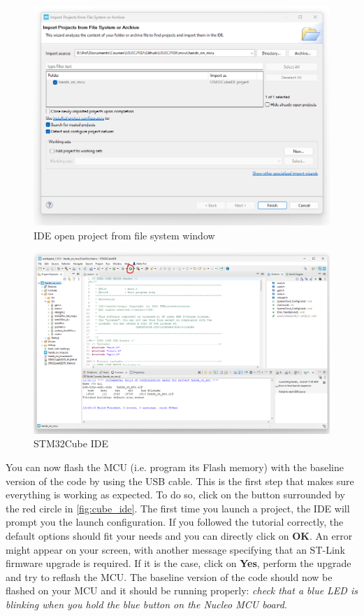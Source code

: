 \begin{figure}[h]
    \centering
    \includegraphics[scale=0.55]{figures/import_ide.png}
    \caption{IDE open project from file system window}
    \label{fig:import_ide}
\end{figure}
\begin{figure}[h]
    \centering
    \includegraphics[scale=0.4]{figures/ide.png}
    \caption{STM32Cube IDE}
    \label{fig:cube_ide}
\end{figure}

You can now flash the MCU (i.e. program its Flash memory) with the baseline version of the code by using the USB cable. This is the first step that makes sure everything is working as expected. To do so, click on the button surrounded by the red circle in \autoref{fig:cube_ide}. The first time you launch a project, the IDE will prompt you the launch configuration. If you followed the tutorial correctly, the default options should fit your needs and you can directly click on \textbf{OK}. An error might appear on your screen, with another message specifying that an ST-Link firmware upgrade is required. If it is the case, click on \textbf{Yes}, perform the upgrade and try to reflash the MCU. The baseline version of the code should now be flashed on your MCU and it should be running properly: \textit{check that a blue LED is blinking when you hold the blue button on the Nucleo MCU board}.

